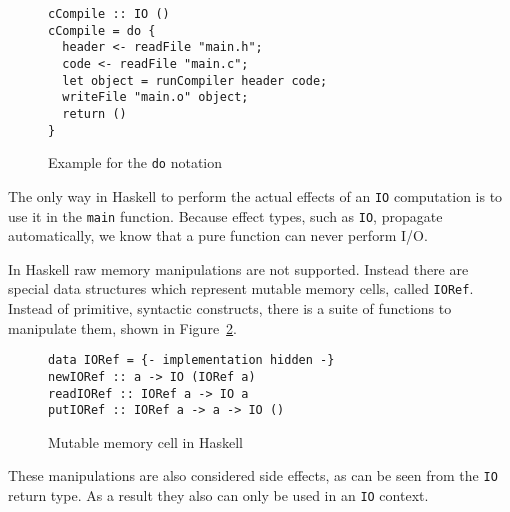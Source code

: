 \begin{figure}
  \begin{lstlisting}
cCompile :: IO ()
cCompile = do {
  header <- readFile "main.h";
  code <- readFile "main.c";
  let object = runCompiler header code;
  writeFile "main.o" object;
  return ()
}
  \end{lstlisting}
  \caption{Example for the \texttt{do} notation}
  \label{fig:simple-do}
\end{figure}


The only way in Haskell to perform the actual effects of an \texttt{IO}
computation is to use it in the \texttt{main} function. Because effect types,
such as \texttt{IO}, propagate automatically, we know that a pure function can
never perform I/O.

In Haskell raw memory manipulations are not supported. Instead there are special
data structures which represent mutable memory cells, called \texttt{IORef}.
Instead of primitive, syntactic constructs, there is a suite of functions to
manipulate them, shown in Figure~\ref{fig:io-ref}.

\begin{figure}
  \begin{lstlisting}
data IORef = {- implementation hidden -}
newIORef :: a -> IO (IORef a)
readIORef :: IORef a -> IO a
putIORef :: IORef a -> a -> IO ()
  \end{lstlisting}
  \caption{Mutable memory cell in Haskell}
  \label{fig:io-ref}
\end{figure}

These manipulations are also considered side effects, as can be seen from the
\texttt{IO} return type. As a result they also can only be used in an
\texttt{IO} context.
